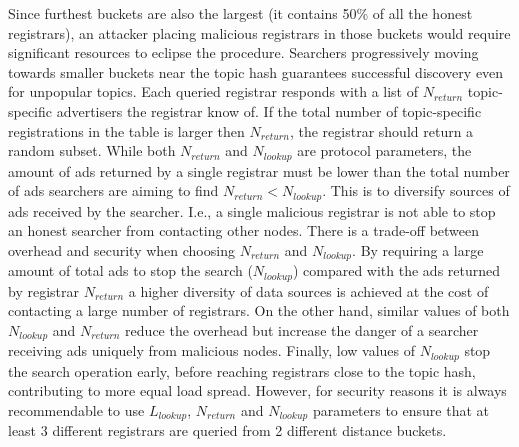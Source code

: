 Since furthest buckets are also the largest (\ie it contains 50\% of all the honest registrars), an attacker placing malicious registrars in those buckets would require significant resources to eclipse the procedure. 
Searchers progressively moving towards smaller buckets near the topic hash guarantees successful discovery even for unpopular topics.
Each queried registrar responds with a list of $N_\textit{return}$ topic-specific advertisers the registrar know of. 
If the total number of topic-specific registrations in the table is larger then
$N_\textit{return}$, the registrar should return a random subset.
While both $N_\textit{return}$ and $N_\textit{lookup}$ are protocol parameters,
the amount of ads returned by a single registrar must be lower than the total
number of ads searchers are aiming to find $N_\textit{return} <
N_\textit{lookup}$. This is to diversify sources of ads received by the searcher. I.e., a single malicious registrar is not able to stop an honest searcher from contacting other nodes.
There is a trade-off between overhead and security when choosing $N_\textit{return}$ and $N_\textit{lookup}$. 
By requiring a large amount of total ads to stop the search
($N_\textit{lookup}$) compared with the  ads returned by registrar
$N_\textit{return}$ a higher diversity of data sources is achieved at the cost of contacting a large number of registrars. On the other hand,  similar values of both $N_\textit{lookup}$ and $N_\textit{return}$ reduce the overhead but increase the danger of a searcher receiving ads uniquely from malicious nodes. Finally,  low values of $N_\textit{lookup}$ stop the search operation early,  before reaching registrars close to the topic hash, contributing to more equal load spread.
However,  for security reasons it is always recommendable to use $L_\textit{lookup}$, $N_\textit{return}$ and $N_\textit{lookup}$ parameters to ensure that at least 3 different registrars are queried from 2 different distance buckets.

